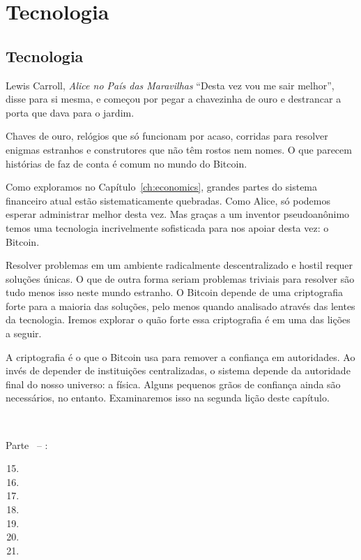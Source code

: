 \part{Tecnologia}
\label{ch:technology}
\chapter*{Tecnologia}

\begin{chapquote}{Lewis Carroll, \textit{Alice no País das Maravilhas}}
\enquote{Desta vez vou me sair melhor}, disse para si mesma, e começou por pegar a chavezinha de ouro e destrancar a porta que dava para o jardim.
\end{chapquote}

Chaves de ouro, relógios que só funcionam por acaso, corridas para resolver enigmas estranhos e construtores que não têm rostos nem nomes. O que parecem histórias de faz de conta é comum no mundo do Bitcoin.

Como exploramos no Capítulo~\ref{ch:economics}, grandes partes do sistema financeiro atual estão sistematicamente quebradas. Como Alice, só podemos esperar administrar melhor desta vez. Mas graças a um inventor pseudoanônimo temos uma tecnologia incrivelmente sofisticada para nos apoiar desta vez: o Bitcoin.

Resolver problemas em um ambiente radicalmente descentralizado e hostil requer soluções únicas. O que de outra forma seriam problemas triviais para resolver são tudo menos isso neste mundo estranho. O Bitcoin depende de uma criptografia forte para a maioria das soluções, pelo menos quando analisado através das lentes da tecnologia. Iremos explorar o quão forte essa criptografia é em uma das lições a seguir.

A criptografia é o que o Bitcoin usa para remover a confiança em autoridades. Ao invés de depender de instituições centralizadas, o sistema depende da autoridade final do nosso universo: a física. Alguns pequenos grãos de confiança ainda são necessários, no entanto. Examinaremos isso na segunda lição deste capítulo.

~

\begin{samepage}
Parte~\ref{ch:technology} -- :

\begin{enumerate}
  \setcounter{enumi}{14}
  \item {}
  \item {}
  \item {}
  \item {}
  \item {}
  \item {}
  \item {}
\end{enumerate}
\end{samepage}

